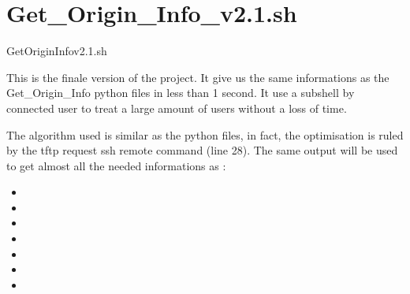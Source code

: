 \documentclass[letterpaper,10pt,english]{sphinxmanual}
\begin{document}
\sphinxstepscope


\chapter{Get\_Origin\_Info\_v2.1.sh}
\label{\detokenize{Get_Origin_Info_v2.1:get-origin-info-v2-1-sh}}\label{\detokenize{Get_Origin_Info_v2.1::doc}}
\begin{sphinxVerbatim}[commandchars=\\\{\}]
Get\PYGZus{}Origin\PYGZus{}Info\PYGZus{}v2.1.sh
\end{sphinxVerbatim}

\sphinxAtStartPar
This is the finale version of the project. It give us the same informations as the Get\_Origin\_Info python files in less than 1 second.
It use a subshell by connected user to treat a large amount of users without a loss of time.

\sphinxAtStartPar
The algorithm used is similar as the python files, in fact, the optimisation is ruled by the tftp request ssh remote command (line 28).
The same output will be used to get almost all the needed informations as :
\begin{itemize}
\item {} 
\sphinxAtStartPar
{}

\item {} 
\sphinxAtStartPar
{}

\item {} 
\sphinxAtStartPar
{}

\item {} 
\sphinxAtStartPar
{}

\item {} 
\sphinxAtStartPar
{}

\item {} 
\sphinxAtStartPar
{}

\item {} 
\sphinxAtStartPar
{}

\end{itemize}
\end{document}

